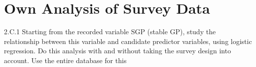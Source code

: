 \section{Own Analysis of Survey Data}
2.C.1 Starting from the recorded variable SGP (stable GP), study the relationship between this
variable and candidate predictor variables, using logistic regression. Do this analysis with
and without taking the survey design into account. Use the entire database for this
\endinput